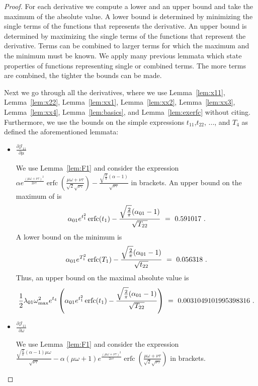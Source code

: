 \documentclass{article}
\DeclareMathOperator{\erfc}{erfc}
\begin{document}
\begin{proof}
For each derivative we compute a lower and an upper bound and take the
maximum of the absolute value. 
A lower bound is determined by minimizing the single terms of the
functions that represents the derivative. An upper bound is determined
by maximizing the single terms of the functions that represent the
derivative. Terms can be combined to larger terms for which
the maximum and the minimum must be known. We apply many previous lemmata
which state properties of functions representing single or combined
terms. The more terms are combined, the tighter the bounds can be
made. 

Next we go through all the derivatives, where we use 
Lemma~\ref{lem:x11}, 
Lemma~\ref{lem:x22}, 
Lemma~\ref{lem:xx1}, 
Lemma~\ref{lem:xx2}, 
Lemma~\ref{lem:xx3},
Lemma~\ref{lem:xx4},
Lemma~\ref{lem:basics}, and
Lemma~\ref{lem:exerfc} without citing. Furthermore, we use the bounds on the simple
expressions $t_{11}$,$t_{22}$, ..., and $T_4$ as defined the aforementioned lemmata:
\begin{itemize}
\item $\frac{\partial {\mathcal J}_{11}}{\partial \mu}$

We use Lemma~\ref{lem:F1} and
consider the expression 
$\alpha  e^{\frac{(\mu \omega+\nu \tau)^2}{2 \nu \tau}} \erfc \left(\frac{\mu \omega+\nu \tau}{\sqrt{2} \sqrt{\nu \tau}}\right)-\frac{\sqrt{\frac{2}{\pi }} (\alpha -1)}{\sqrt{\nu \tau}}$
in brackets.
An upper bound on the maximum of is
\begin{align}
\alpha_{\rm 01} e^{t_1^2}
  \erfc (t_1)-\frac{\sqrt{\frac{2}{\pi }}
  (\alpha_{\rm 01}-1)}{\sqrt{T_{22}}} \ = \ 0.591017 \ .
\end{align}
A lower bound on the minimum is
\begin{align}
\alpha_{\rm 01} e^{T_1^2}
  \erfc (T_1)-\frac{\sqrt{\frac{2}{\pi }}
  (\alpha_{\rm 01}-1)}{\sqrt{t_{22}}} \ = \ 0.056318 \ .
\end{align}
Thus, an upper bound on the maximal absolute value is 
\begin{align}
\frac{1}{2} \lambda_{\rm 01} \omega_{\rm max}^2 e^{t_4}
  \left(\alpha_{\rm 01} e^{t_1^2}
  \erfc (t_1)-\frac{\sqrt{\frac{2}{\pi }}
  (\alpha_{\rm 01}-1)}{\sqrt{T_{22}}}\right) \ = \
0.0031049101995398316\ .
\end{align}

\item $\frac{\partial {\mathcal J}_{11}}{\partial \omega}$

We use Lemma~\ref{lem:F1} and
consider the expression 
$\frac{\sqrt{\frac{2}{\pi }} (\alpha -1) \mu \omega}{\sqrt{\nu \tau}}-\alpha  (\mu \omega+1) e^{\frac{(\mu \omega+\nu \tau)^2}{2 \nu \tau}} \erfc \left(\frac{\mu \omega+\nu \tau}{\sqrt{2} \sqrt{\nu \tau}}\right)$
in brackets.


\end{itemize}
\end{proof}
\end{document}
